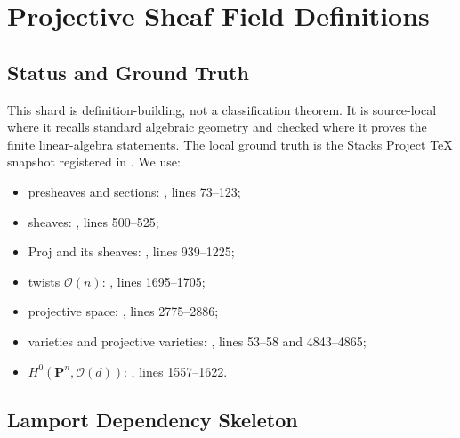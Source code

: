 
\section{Projective Sheaf Field Definitions}
\label{sec:projective-sheaf-field-definitions}

\subsection{Status and Ground Truth}

This shard is definition-building, not a classification theorem.  It is
source-local where it recalls standard algebraic geometry and checked where it
proves the finite linear-algebra statements.  The local ground truth is the
Stacks Project TeX snapshot registered in
.  We use:
\begin{itemize}
  \item presheaves and sections:
  , lines 73--123;
  \item sheaves: , lines 500--525;
  \item Proj and its sheaves:
  , lines 939--1225;
  \item twists \(\mathcal O(n)\):
  , lines 1695--1705;
  \item projective space:
  , lines 2775--2886;
  \item varieties and projective varieties:
  , lines 53--58 and 4843--4865;
  \item \(H^0(\mathbf P^n,\mathcal O(d))\):
  , lines 1557--1622.
\end{itemize}

\subsection{Lamport Dependency Skeleton}

